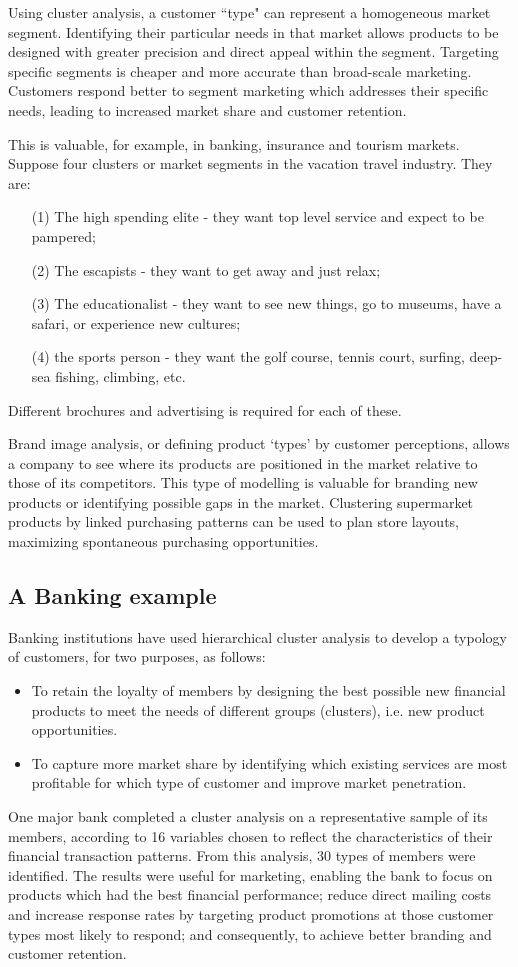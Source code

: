 \documentclass[a4paper,12pt]{article}
\begin{document}
Using cluster analysis, a customer ``type" can represent a homogeneous market segment.
Identifying their particular needs in that market allows products to be designed with greater
precision and direct appeal within the segment. Targeting specific segments is cheaper and
more accurate than broad-scale marketing. Customers respond better to segment marketing
which addresses their specific needs, leading to increased market share and customer
retention.

This is valuable, for example, in banking, insurance and tourism markets. Suppose
four clusters or market segments in the vacation travel industry. They are:
\begin{itemize}
\item[(1)] The high spending elite - they want top level service and expect to be pampered;
\item[(2)] The escapists - they want to get away and just relax;
\item[(3)] The educationalist - they want to see new things, go to museums,
have a safari, or experience new cultures;
\item[(4)] the sports person - they want the golf course, tennis court, surfing, deep-sea fishing, climbing, etc.
\end{itemize}
Different brochures and advertising is required for each of these.

Brand image analysis, or defining product `types' by customer perceptions, allows
a company to see where its products are positioned in the market relative to those of its
competitors. This type of modelling is valuable for branding new products or identifying
possible gaps in the market. Clustering supermarket products by linked purchasing patterns
can be used to plan store layouts, maximizing spontaneous purchasing opportunities.

\subsection{A Banking example}
Banking institutions have used hierarchical cluster analysis to develop a typology of customers, for two purposes, as follows:
\begin{itemize}
\item To retain the loyalty of members by designing the best possible new financial products to meet the needs of different groups (clusters), i.e. new product opportunities.
\item To capture more market share by identifying which existing services are most profitable for which type of customer and improve market penetration.
\end{itemize}
One major bank completed a cluster analysis on a representative sample of its members, according to 16 variables chosen to reflect the characteristics of their financial transaction patterns. From this analysis, 30 types of members were identified. The results were useful for marketing, enabling the bank to focus on products which had the best financial performance; reduce direct mailing costs and increase response rates by targeting product promotions at those customer types most likely to respond; and consequently, to achieve better branding and customer retention.
\end{document}

